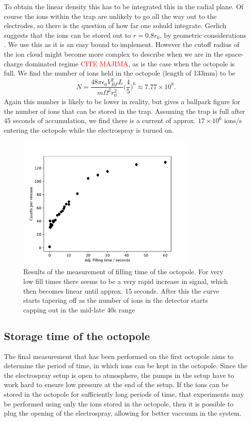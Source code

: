 To obtain the linear density this has to be integrated this in the radial plane.
Of course the ions within the trap are unlikely to go all the way out to the electrodes, so there is the question of how far one sohuld integrate. Gerlich suggests that the ions can be stored out to $r = 0.8r_0$, by geometric considerations \cite{Gerlich1992}. We use this as it is an easy bound to implement. However the cutoff radius of the ion cloud might become more complex to describe when we are in the 
space-charge dominated regime \textcolor{red}{CITE MAJIMA}, as is the case when the octopole is full. We find the number of ions held in the octopole (length of 133mm) to be
\begin{equation}
    N = \frac{48\pi\epsilon_0V_{RF}^2L}{m\Omega^2r_0^2}\bigg(\frac{4}{5}\bigg)^6\approx 7.77\times 10^8.
\end{equation}
Again this number is likely to be lower in reality, but gives a ballpark figure for the number of ions that can be stored in the trap. Assuming the trap is full after 45 seconds of accumulation, we find there is a current of approx. $17\times 10^6$ ions/s entering the octopole while the electrospray is turned on.


\begin{figure}
    \centering
    \includegraphics[width = 0.8\textwidth]{main/FillingTimeGraph.pdf}
    \caption{Results of the measurement of filling time of the octopole. For very low fill times there seems to be a very rapid increase in signal, which then becomes linear until approx. 15 seconds. After this the curve starts tapering off as the number of ions in the detector starts capping out in the mid-late 40s range}
    \label{fig:fillTimeGraph}
\end{figure}
\subsection{Storage time of the octopole}
The final measurement that has been performed on the first octopole aims to determine the period of time, in which ions can be kept in the octopole. Since the the electrospray setup is open to atmosphere, the pumps in the setup have to work hard to ensure low pressure at the end of the setup.
If the ions can be stored in the octopole for sufficiently long periods of time, that experiments may be performed using only the ions stored in the octopole, then it is possible to plug the opening of the electrospray, allowing for better vaccuum in the system.


